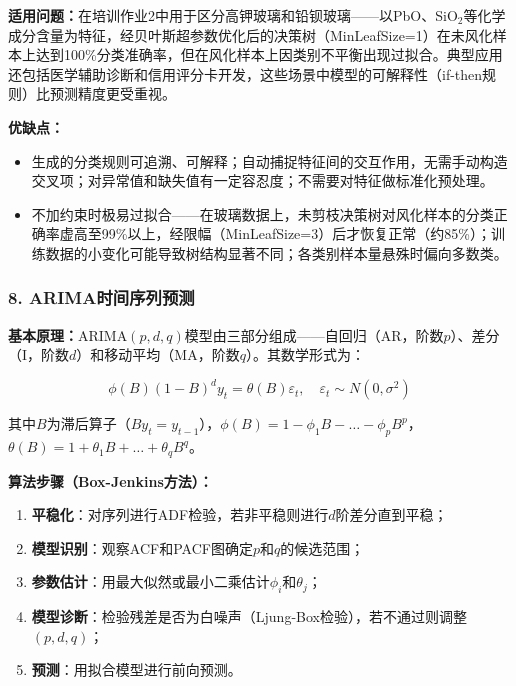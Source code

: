 \documentclass[12pt,a4paper]{ctexart}
\begin{document}
\textbf{适用问题：}在培训作业2中用于区分高钾玻璃和铅钡玻璃——以PbO、SiO$_2$等化学成分含量为特征，经贝叶斯超参数优化后的决策树（MinLeafSize=1）在未风化样本上达到100\%分类准确率，但在风化样本上因类别不平衡出现过拟合。典型应用还包括医学辅助诊断和信用评分卡开发，这些场景中模型的可解释性（if-then规则）比预测精度更受重视。

\textbf{优缺点：}
\begin{itemize}[leftmargin=*]
    \item[+] 生成的分类规则可追溯、可解释；自动捕捉特征间的交互作用，无需手动构造交叉项；对异常值和缺失值有一定容忍度；不需要对特征做标准化预处理。
    \item[$-$] 不加约束时极易过拟合——在玻璃数据上，未剪枝决策树对风化样本的分类正确率虚高至99\%以上，经限幅（MinLeafSize=3）后才恢复正常（约85\%）；训练数据的小变化可能导致树结构显著不同；各类别样本量悬殊时偏向多数类。
\end{itemize}

\subsubsection{8. ARIMA时间序列预测}

\textbf{基本原理：}ARIMA$(p,d,q)$模型由三部分组成——自回归（AR，阶数$p$）、差分（I，阶数$d$）和移动平均（MA，阶数$q$）。其数学形式为：

\begin{equation}
\phi(B) (1-B)^d y_t = \theta(B) \varepsilon_t, \quad \varepsilon_t \sim N(0, \sigma^2)
\end{equation}

其中$B$为滞后算子（$By_t = y_{t-1}$），$\phi(B) = 1 - \phi_1 B - \dots - \phi_p B^p$，$\theta(B) = 1 + \theta_1 B + \dots + \theta_q B^q$。

\textbf{算法步骤（Box-Jenkins方法）：}
\begin{enumerate}[label=(\arabic*), leftmargin=*]
    \item \textbf{平稳化}：对序列进行ADF检验，若非平稳则进行$d$阶差分直到平稳；
    \item \textbf{模型识别}：观察ACF和PACF图确定$p$和$q$的候选范围；
    \item \textbf{参数估计}：用最大似然或最小二乘估计$\phi_i$和$\theta_j$；
    \item \textbf{模型诊断}：检验残差是否为白噪声（Ljung-Box检验），若不通过则调整$(p,d,q)$；
    \item \textbf{预测}：用拟合模型进行前向预测。
\end{enumerate}
\end{document}
